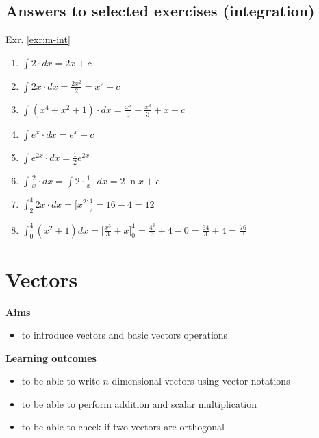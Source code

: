 \documentclass[
]{book}
\providecommand{\tightlist}{%
  \setlength{\itemsep}{0pt}\setlength{\parskip}{0pt}}
\theoremstyle{definition}
\theoremstyle{definition}
\theoremstyle{definition}
\theoremstyle{remark}
\begin{document}
\hypertarget{answers-to-selected-exercises-integration}{%
\section*{Answers to selected exercises (integration)}\label{answers-to-selected-exercises-integration}}

Exr. \ref{exr:m-int}

\begin{enumerate}
\def\labelenumi{\alph{enumi})}
\tightlist
\item
  \(\int 2 \cdot dx = 2x +c\)
\item
  \(\int 2x\cdot dx = \frac{2x^2}{2} = x^2 + c\)
\item
  \(\int (x^4 + x^2 + 1)\cdot dx = \frac{x^5}{5} + \frac{x^3}{3} + x + c\)
\item
  \(\int e^x\cdot dx = e^x + c\)
\item
  \(\int e^{2x}\cdot dx = \frac{1}{2}e^{2x}\)
\item
  \(\int \frac{2}{x}\cdot dx =\int 2\cdot \frac{1}{x}\cdot dx = 2 \ln{x}+ c\)
\item
  \(\int_2^4 2x\cdot dx = \Bigr[x^2\Bigr]_2^4 = 16 - 4 = 12\)
\item
  \(\int_0^4 (x^2+1)dx = \Bigr[\frac{x^3}{3} + x \Bigr]_0^4=\frac{4^3}{3}+4 - 0 = \frac{64}{3}+4 = \frac{76}{3}\)
\end{enumerate}

\hypertarget{vectors}{%
\chapter{Vectors}\label{vectors}}

\textbf{Aims}

\begin{itemize}
\tightlist
\item
  to introduce vectors and basic vectors operations
\end{itemize}

\textbf{Learning outcomes}

\begin{itemize}
\tightlist
\item
  to be able to write \(n\)-dimensional vectors using vector notations
\item
  to be able to perform addition and scalar multiplication
\item
  to be able to check if two vectors are orthogonal
\end{itemize}
\end{document}
